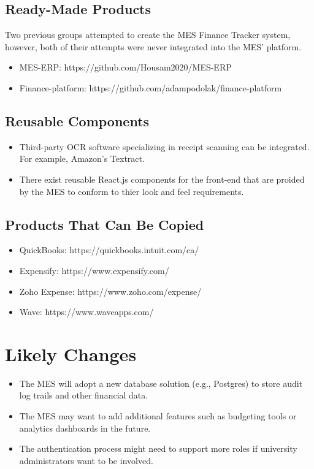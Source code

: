 \documentclass[12pt]{article}
\begin{document}
\begin{enumerate}
  \subsection{Ready-Made Products}
  Two previous groups attempted to create the MES Finance Tracker system, however, both of their attempts were never integrated into the MES' platform.  
  \begin{itemize}
      \item MES-ERP: https://github.com/Housam2020/MES-ERP
      \item Finance-platform: https://github.com/adampodolak/finance-platform
    \end{itemize}

  \subsection{Reusable Components}
    \begin{itemize}
      \item Third-party OCR software specializing in receipt scanning can be integrated. For example, Amazon's Textract.
      \item There exist reusable React.js components for the front-end that are proided by the MES to conform to thier look and feel requirements.
    \end{itemize}

  \subsection{Products That Can Be Copied}
    \begin{itemize}
      \item QuickBooks: https://quickbooks.intuit.com/ca/
      \item Expensify: https://www.expensify.com/
      \item Zoho Expense: https://www.zoho.com/expense/
      \item Wave: https://www.waveapps.com/
    \end{itemize}

\section{Likely Changes}
  \begin{itemize}
    \item The MES will adopt a new database solution (e.g., Postgres) to store audit log trails and other financial data.
    \item The MES may want to add additional features such as budgeting tools or analytics dashboards in the future.
    \item The authentication process might need to support more roles if university administrators want to be involved.
  \end{itemize}    


\end{enumerate}
\end{document}
